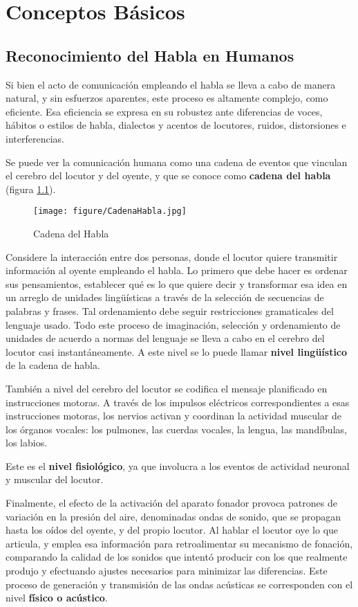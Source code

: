 \chapter{Conceptos Básicos}


\section{Reconocimiento del Habla en Humanos\cite{gales}}

Si bien el acto de comunicación empleando el habla se lleva a cabo de manera natural, y sin esfuerzos aparentes, este proceso es altamente complejo, como eficiente. Esa eficiencia se expresa en su robustez ante diferencias de voces,
hábitos o estilos de habla, dialectos y acentos de locutores, ruidos, distorsiones e interferencias. 

Se puede ver la comunicación humana como una cadena de eventos que vinculan el cerebro del locutor y del oyente, y que se conoce como \textbf{cadena del habla} (figura \ref{fig:cadenahabla}).
\begin{figure}[H]
\centering
\texttt{[image: figure/CadenaHabla.jpg]}
\caption{Cadena del Habla}
\label{fig:cadenahabla}
\end{figure}


Considere la interacción entre dos personas, donde el locutor quiere transmitir información al oyente empleando el habla. Lo primero que debe hacer es ordenar sus pensamientos, establecer qué es lo que quiere decir y transformar esa idea en un arreglo de unidades lingüísticas a través de la selección de secuencias de palabras y frases.
Tal ordenamiento debe seguir restricciones gramaticales del lenguaje usado. Todo este proceso de imaginación, selección y ordenamiento de unidades de acuerdo a normas del lenguaje se lleva a cabo en el cerebro del locutor casi instantáneamente. A este nivel se lo puede llamar \textbf{nivel lingüístico} de la cadena de habla. 

También a nivel del cerebro del locutor se codifica el mensaje planificado en instrucciones motoras. A través de los impulsos eléctricos correspondientes a esas instrucciones motoras, los nervios activan y coordinan la actividad muscular de los órganos vocales: los pulmones, las cuerdas vocales, la lengua, las mandíbulas, los labios.

Este es el \textbf{nivel fisiológico}, ya que involucra a los eventos de actividad neuronal y muscular del locutor.

Finalmente, el efecto de la activación del aparato fonador provoca patrones de variación en la presión del aire, denominadas ondas de sonido, que se propagan hasta los oídos del oyente, y del propio locutor. Al hablar el locutor oye lo que articula, y emplea esa información para retroalimentar su mecanismo de fonación, comparando la calidad de los sonidos que intentó producir con los que realmente produjo y
efectuando ajustes necesarios para minimizar las diferencias.
Este proceso de generación y transmisión de las ondas acústicas se corresponden con el nivel \textbf{físico o acústico}.

